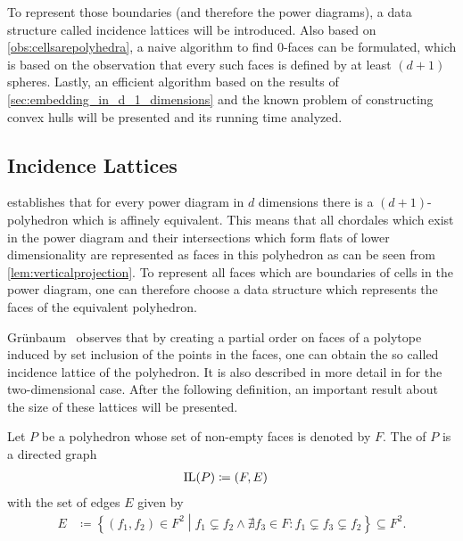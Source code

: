 To represent those boundaries (and therefore the power diagrams), a data structure called incidence lattices will be introduced.
Also based on \cref{obs:cellsarepolyhedra}, a naive algorithm to find $0$-faces can be formulated, which is based on the observation that every such faces is defined by at least $(d+1)$ spheres.
Lastly, an efficient algorithm based on the results of \cref{sec:embedding_in_d_1_dimensions} and the known problem of constructing convex hulls will be presented and its running time analyzed.

\subsection{Incidence Lattices}
\label{sub:incidence_lattices}
 establishes that for every power diagram in $d$ dimensions there is a $(d+1)$-polyhedron which is affinely equivalent.
This means that all chordales which exist in the power diagram and their intersections which form flats of lower dimensionality are represented as faces in this polyhedron as can be seen from \cref{lem:verticalprojection}.
To represent all faces which are boundaries of cells in the power diagram, one can therefore choose a data structure which represents the faces of the equivalent polyhedron.

Grünbaum~\cite{grunbaum2003convex} observes that by creating a partial order on faces of a polytope induced by set inclusion of the points in the faces, one can obtain the so called incidence lattice of the polyhedron.
It is also described in more detail in \cite{edelsbrunner1986constructing} for the two-dimensional case.
After the following definition, an important result about the size of these lattices will be presented.

\begin{definition}
    \label{def:incidencelattice}
    Let $P$ be a polyhedron whose set of non-empty faces is denoted by $F$.
    The  of $P$ is a directed graph
    \begin{align}
        \operatorname{IL}(P) &\coloneqq (F, E)
    \end{align}
    with the set of edges $E$ given by
    \begin{align}
        E &\coloneqq \left\{ (f_1, f_2) \in F^2 \middle| f_1 \subsetneq f_2 \wedge \nexists f_3 \in F : f_1 \subsetneq f_3 \subsetneq f_2 \right\} \subseteq F^2.
    \end{align}
\end{definition}

